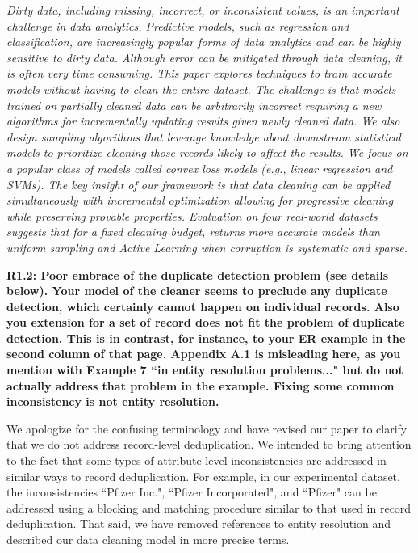 \emph{Dirty data, including missing, incorrect, or inconsistent values, is an important challenge in data analytics.
Predictive models, such as regression and classification, are increasingly popular forms of data analytics and can be highly sensitive to dirty data.
Although error can be mitigated through data cleaning, it is often very time consuming.
This paper explores techniques to train accurate models without having to clean the entire dataset.
The challenge is that models trained on partially cleaned data can be arbitrarily incorrect requiring a new algorithms for incrementally updating results given newly cleaned data.
We also design sampling algorithms that leverage knowledge about downstream statistical models to prioritize cleaning those records likely to affect the results.
We focus on a popular class of models called convex loss models (e.g., linear regression and SVMs).
The key insight of our framework is that data cleaning can be applied simultaneously with incremental optimization allowing for progressive cleaning while preserving provable properties.
Evaluation on four real-world datasets suggests that for a fixed cleaning budget, \sys returns more accurate models than uniform sampling and Active Learning when corruption is systematic and sparse.}

\vspace{0.5em}

\noindent\textbf{R1.2: Poor embrace of the duplicate detection problem (see details below). Your model of the cleaner seems to preclude any duplicate detection, which certainly cannot happen on individual records. Also you extension for a set of record does not fit the problem of duplicate detection. This is in contrast, for instance, to your ER example in the second column of that page. Appendix A.1 is misleading here, as you mention with Example 7 ``in entity resolution problems..." but do not actually address that problem in the example. Fixing some common inconsistency is not entity resolution.}

We apologize for the confusing terminology and have revised our paper to clarify that we do not address record-level deduplication.
We intended to bring attention to the fact that some types of attribute level inconsistencies are addressed in similar ways to record deduplication.
For example, in our experimental dataset, the inconsistencies ``Pfizer Inc.", ``Pfizer Incorporated", and ``Pfizer" can be addressed using a blocking and matching procedure similar to that used in record deduplication.
That said, we have removed references to entity resolution and described our data cleaning model in more precise terms.

